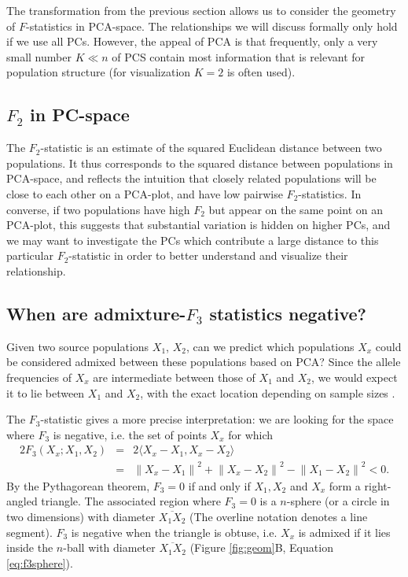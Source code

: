 \documentclass[12pt,fullpage, a4paper]{article}
\newcommand{\normsq}[1]{\left\lVert#1\right\rVert^2}
\begin{document}
The transformation from the previous section allows us to consider the geometry
of $F$-statistics in PCA-space. The relationships we will discuss formally only
hold if we use all PCs. However, the appeal of PCA is that frequently,
only a very small number $K \ll n$ of PCS contain most information that is
relevant for population structure (for visualization
$K=2$ is often used). 

\subsection{$F_2$ in PC-space}
The $F_2$-statistic is an estimate of the squared Euclidean distance between two
populations. It thus corresponds to the squared distance between populations in PCA-space, and
reflects the intuition that closely related populations  will be close to each other on a
PCA-plot, and have low pairwise $F_2$-statistics. In converse, if two
populations have high $F_2$ but appear on the same point on an PCA-plot, this suggests
that substantial variation is hidden on higher PCs, and we may want to investigate the PCs which contribute a large distance to this particular $F_2$-statistic in order to better understand and visualize their relationship.


\subsection{When are admixture-$F_3$ statistics negative?}
Given two source populations $X_1$, $X_2$, can we predict which populations $X_x$ could be considered admixed between these populations based on PCA? Since the allele frequencies of $X_x$ are intermediate between those of $X_1$ and $X_2$, we would expect it to lie between $X_1$ and $X_2$, with the exact location depending on sample sizes \citep{brisbin2012, mcvean2009}. 

The $F_3$-statistic gives a more precise interpretation: we are looking for the space where $F_3$ is negative, i.e. the set of points $X_x$ for which 
\begin{eqnarray}
2 F_3(X_x; X_1, X_2) &=& 2\langle  X_x - X_1, X_x - X_2 \rangle \nonumber\\
      &=& \normsq{X_x - X_1} + \normsq{X_x - X_2}  - \normsq{X_1 - X_2} < 0 \label{eq:f3neg}\text{.}
\end{eqnarray}
By the Pythagorean theorem, $F_3 = 0 $ if and only if $X_1, X_2$ and $X_x$ form a right-angled triangle. The associated region where $F_3=0$ is a $n$-sphere (or a circle in two dimensions) with diameter $\overline{X_1X_2}$ (The overline notation denotes a line segment). $F_3$ is negative when the triangle is obtuse, i.e. $X_x$ is admixed if it lies inside the $n$-ball with diameter $\overline{X_1X_2}$ (Figure \ref{fig:geom}B, Equation \ref{eq:f3sphere}). 
\end{document}
